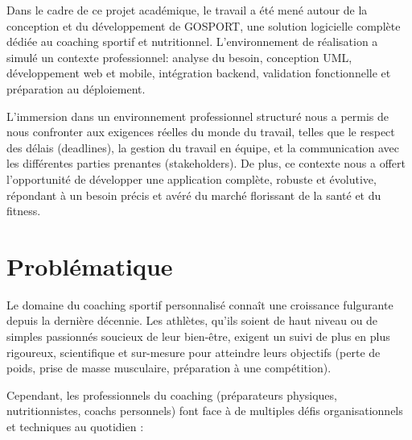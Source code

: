 Dans le cadre de ce projet académique, le travail a été mené autour de la conception et du développement de GOSPORT, une solution logicielle complète dédiée au coaching sportif et nutritionnel. L'environnement de réalisation a simulé un contexte professionnel: analyse du besoin, conception UML, développement web et mobile, intégration backend, validation fonctionnelle et préparation au déploiement.

L'immersion dans un environnement professionnel structuré nous a permis de nous confronter aux exigences réelles du monde du travail, telles que le respect des délais (deadlines), la gestion du travail en équipe, et la communication avec les différentes parties prenantes (stakeholders). De plus, ce contexte nous a offert l'opportunité de développer une application complète, robuste et évolutive, répondant à un besoin précis et avéré du marché florissant de la santé et du fitness.

\section{Problématique}
Le domaine du coaching sportif personnalisé connaît une croissance fulgurante depuis la dernière décennie. Les athlètes, qu'ils soient de haut niveau ou de simples passionnés soucieux de leur bien-être, exigent un suivi de plus en plus rigoureux, scientifique et sur-mesure pour atteindre leurs objectifs (perte de poids, prise de masse musculaire, préparation à une compétition). 

Cependant, les professionnels du coaching (préparateurs physiques, nutritionnistes, coachs personnels) font face à de multiples défis organisationnels et techniques au quotidien :

